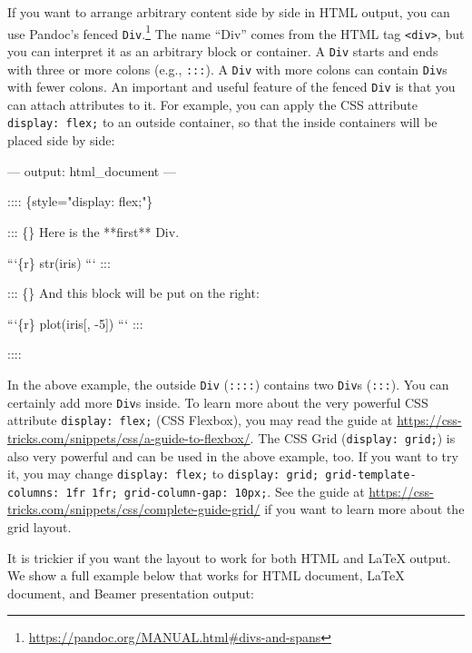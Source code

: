 \documentclass[
  11pt,
]{krantz}
\newenvironment{Shaded}{\begin{snugshade}}{\end{snugshade}}
\newcommand{\BaseNTok}[1]{\textcolor[rgb]{0.06,0.06,0.06}{#1}}
\newcommand{\NormalTok}[1]{#1}
\renewcommand{\href}[2]{#2\footnote{\url{#1}}}
\begin{document}
If you want to arrange arbitrary content side by side in HTML output, you can use Pandoc's \href{https://pandoc.org/MANUAL.html\#divs-and-spans}{fenced \texttt{Div}.} The name ``Div'' comes from the HTML tag \texttt{\textless{}div\textgreater{}}, but you can interpret it as an arbitrary block or container. A \texttt{Div} starts and ends with three or more colons (e.g., \texttt{:::}). A \texttt{Div} with more colons can contain \texttt{Div}s with fewer colons. An important and useful feature of the fenced \texttt{Div} is that you can attach attributes to it. For example, you can apply the CSS attribute \texttt{display:\ flex;} to an outside container, so that the inside containers will be placed side by side:

\begin{Shaded}
\begin{Highlighting}[]
\NormalTok{---}
\NormalTok{output: html_document}
\NormalTok{---}

\NormalTok{:::: \{style="display: flex;"\}}

\NormalTok{::: \{\}}
\NormalTok{Here is the **first** Div.}

\BaseNTok{```\{r\}}
\BaseNTok{str(iris)}
\BaseNTok{```}
\NormalTok{:::}

\NormalTok{::: \{\}}
\NormalTok{And this block will be put on the right:}

\BaseNTok{```\{r\}}
\BaseNTok{plot(iris[, -5])}
\BaseNTok{```}
\NormalTok{:::}

\NormalTok{::::}
\end{Highlighting}
\end{Shaded}

In the above example, the outside \texttt{Div} (\texttt{::::}) contains two \texttt{Div}s (\texttt{:::}). You can certainly add more \texttt{Div}s inside. To learn more about the very powerful CSS attribute \texttt{display:\ flex;} (CSS Flexbox), you may read the guide at \url{https://css-tricks.com/snippets/css/a-guide-to-flexbox/}. The CSS Grid (\texttt{display:\ grid;}) is also very powerful and can be used in the above example, too. If you want to try it, you may change \texttt{display:\ flex;} to \texttt{display:\ grid;\ grid-template-columns:\ 1fr\ 1fr;\ grid-column-gap:\ 10px;}. See the guide at \url{https://css-tricks.com/snippets/css/complete-guide-grid/} if you want to learn more about the grid layout.

It is trickier if you want the layout to work for both HTML and LaTeX output. We show a full example below that works for HTML document, LaTeX document, and Beamer presentation output:
\end{document}
